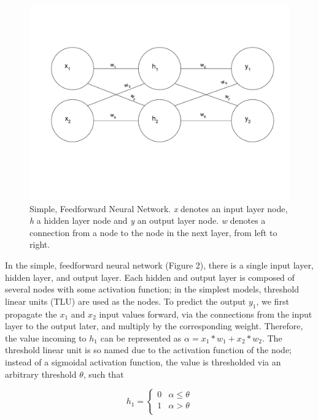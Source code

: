 \documentclass[11pt,titlepage]{article}
\begin{document}
\begin{figure}[H]
\begin{center}
\includegraphics[scale=0.5,trim={0 3cm 0 3cm},clip]{./Figures/smallNN.pdf}
\end{center}
\caption[Simple, Feedforward Neural Network]{Simple, Feedforward Neural Network. \textit{x} denotes an input layer node, \textit{h} a hidden layer node and \textit{y} an output layer node. \textit{w} denotes a connection from a node to the node in the next layer, from left to right.}
\end{figure}

In the simple, feedforward neural network (Figure 2), there is a single input layer, hidden layer, and output layer. Each hidden and output layer is composed of several nodes with some activation function; in the simplest models, threshold linear units (TLU) are used as the nodes.  To predict the output $y_1$, we first propagate the $x_1$ and $x_2$ input values forward, via the connections from the input layer to the output later, and multiply by the corresponding weight. Therefore, the value incoming to $h_1$ can be represented as $\alpha = x_1*w_1 + x_2*w_2$. The threshold linear unit is so named due to the activation function of the node; instead of a sigmoidal activation function, the value is thresholded via an arbitrary threshold $\theta$, such that 

\[ h_1 = \begin{cases}
	0 & \alpha \leq \theta\\
	1 & \alpha > \theta\\
	\end{cases}
\]
\end{document}
